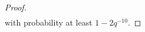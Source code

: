 \documentclass{article}
\theoremstyle{plain}
\theoremstyle{definition}
\theoremstyle{remark}
\begin{document}
\begin{proof}
\begin{align}
\end{align}
with probability at least $1-2q^{-10}$.  

\end{proof}
\end{document}
